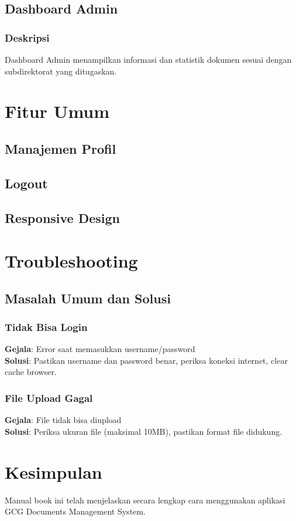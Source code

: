 \documentclass[12pt,a4paper]{article}
\begin{document}
\subsection{Dashboard Admin}
\subsubsection{Deskripsi}
Dashboard Admin menampilkan informasi dan statistik dokumen sesuai dengan subdirektorat yang ditugaskan.

\section{Fitur Umum}
\subsection{Manajemen Profil}
\subsection{Logout}
\subsection{Responsive Design}

\section{Troubleshooting}
\subsection{Masalah Umum dan Solusi}
\subsubsection{Tidak Bisa Login}
\textbf{Gejala}: Error saat memasukkan username/password\\
\textbf{Solusi}: Pastikan username dan password benar, periksa koneksi internet, clear cache browser.

\subsubsection{File Upload Gagal}
\textbf{Gejala}: File tidak bisa diupload\\
\textbf{Solusi}: Periksa ukuran file (maksimal 10MB), pastikan format file didukung.

\section{Kesimpulan}
Manual book ini telah menjelaskan secara lengkap cara menggunakan aplikasi GCG Documents Management System.
\end{document}
